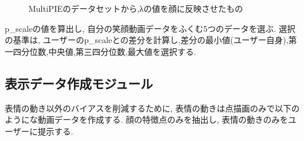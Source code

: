 \begin{figure}[htbp]
    \begin{center}
    \end{center}
    \caption{Multi\-PIEのデータセットから,λの値を顔に反映させたもの}
    \label{fig:face_balance}
\end{figure}


p\_scaleの値を算出し, 自分の笑顔動画データをふくむ5つのデータを選ぶ.
選択の基準は, ユーザーのp\_scaleとの差分を計算し,差分の最小値(ユーザー自身),第一四分位数,中央値,第三四分位数,最大値を選択する.

\subsection{表示データ作成モジュール}
表情の動き以外のバイアスを削減するために, 表情の動きは点描画のみで以下のようにな動画データを作成する.
顔の特徴点のみを抽出し, 表情の動きのみをユーザーに提示する.

